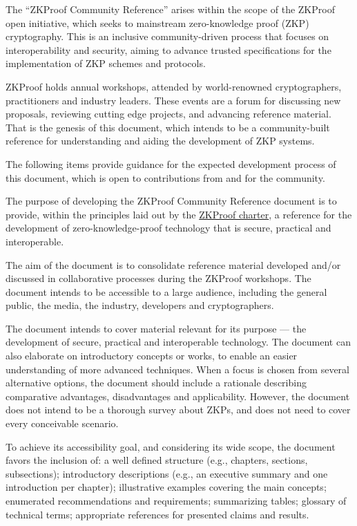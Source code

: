 \label{sec:prelim:about-this-community-reference}

The ``ZKProof Community Reference'' arises within the scope of the ZKProof open initiative, which seeks to mainstream zero-knowledge proof (ZKP) cryptography.
This is an inclusive community-driven process that focuses on interoperability and security, aiming to advance trusted specifications for the implementation of ZKP schemes and protocols.

ZKProof holds annual workshops, attended by world-renowned cryptographers, practitioners and industry leaders.
These events are a forum for discussing new proposals, reviewing cutting edge projects, and advancing reference material.
That is the genesis of this document, which intends to be a community-built reference for understanding and aiding the development of ZKP systems.

The following items provide guidance for the expected development process of this document, which is open to contributions from and for the community.

The purpose of developing the ZKProof Community Reference document is to provide, within the principles laid out by the \hyperref[sec:prelim:charter]{ZKProof charter}, a reference for the development of zero-knowledge-proof technology that is secure, practical and interoperable.

The aim of the document is to consolidate reference material developed and/or discussed in collaborative processes during the ZKProof workshops. 
The document intends to be accessible to a large audience, including the general public, the media, the industry, developers and cryptographers.

The document intends to cover material relevant for its purpose --- the development of secure, practical and interoperable technology.
The document can also elaborate on introductory concepts or works, to enable an easier understanding of more advanced techniques. 
When a focus is chosen from several alternative options, the document should include a rationale describing comparative advantages, disadvantages and applicability. 
However, the document does not intend to be a thorough survey about ZKPs, and does not need to cover every conceivable scenario.

To achieve its accessibility goal, and considering its wide scope, the document favors the inclusion of: 
	a well defined structure (e.g., chapters, sections, subsections);
	introductory descriptions (e.g., an executive summary and one introduction per chapter); 
	illustrative examples covering the main concepts; 
	enumerated recommendations and requirements; 
	summarizing tables; 
	glossary of technical terms; 
	appropriate references for presented claims and results.

